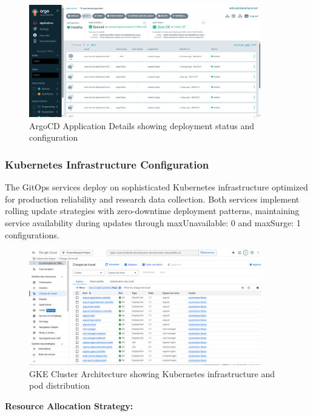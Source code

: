 \begin{figure}[H]
\centering
\includegraphics[width=0.9\textwidth]{figures/chapter4/argocd-application-details.png}
\caption{ArgoCD Application Details showing deployment status and configuration}
\label{fig:argocd-application-details}
\end{figure}

\subsubsection{Kubernetes Infrastructure Configuration}

The GitOps services deploy on sophisticated Kubernetes infrastructure optimized for production reliability and research data collection. Both services implement rolling update strategies with zero-downtime deployment patterns, maintaining service availability during updates through maxUnavailable: 0 and maxSurge: 1 configurations.

\begin{figure}[H]
\centering
\includegraphics[width=0.9\textwidth]{figures/chapter4/gke-cluster-architecture.png}
\caption{GKE Cluster Architecture showing Kubernetes infrastructure and pod distribution}
\label{fig:gke-cluster-architecture}
\end{figure}

\textbf{Resource Allocation Strategy:}

